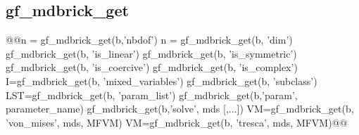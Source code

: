 \subsection{gf\_mdbrick_get}
\begin{synopsis}
@@\tint n = gf_mdbrick_get(b,'nbdof')
\tint n = gf_mdbrick_get(b, 'dim')
\tint gf_mdbrick_get(b, 'is_linear')
\tint gf_mdbrick_get(b, 'is_symmetric')
\tint gf_mdbrick_get(b, 'is_coercive')
\tint gf_mdbrick_get(b, 'is_complex')
\tivec I=gf_mdbrick_get(b, 'mixed_variables')
\tstr gf_mdbrick_get(b, 'subclass')
LST=gf_mdbrick_get(b, 'param_list')
\tvec gf_mdbrick_get(b,'param', \tstr parameter_name)
gf_mdbrick_get(b,'solve', \tmdstate mds [,...])
\tvec VM=gf_mdbrick_get(b, 'von_mises', \tmdstate mds, \tmf MFVM)
\tvec VM=gf_mdbrick_get(b, 'tresca', \tmdstate mds, \tmf MFVM)@@
\end{synopsis}

